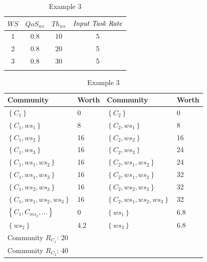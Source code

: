 \documentclass[10pt,journal,cspaper,compsoc]{IEEEtran}
\begin{document}
\begin{table}[!t]
\renewcommand{\arraystretch}{1.3}
\caption{Example 3} \label{example_3} \centering
\begin{tabular}{c c c c}
\hline
$WS$ & $QoS_{ws}$ & $Th_{ws}$ & $\text{\emph{Input Task Rate}}$\\
\hline
1 & 0.8 & 10 & 5\\
2 & 0.8 & 20 & 5\\
3 & 0.8 & 30 & 5\\
\hline\\
\end{tabular}
%
\renewcommand{\arraystretch}{1.3}
\label{example_3_2} \centering
\begin{tabular}{l l || l l}
\hline
Community & Worth & Community & Worth\\
\hline
$\left\{C_{1}\right\}$ & 0 & $\left\{C_{2}\right\}$ & 0\\
$\left\{C_{1}, ws_1\right\}$ & 8 & $\left\{C_{2}, ws_1\right\}$ & 8\\
$\left\{C_{1}, ws_2\right\}$ & 16 & $\left\{C_{2}, ws_2\right\}$ & 16\\
$\left\{C_{1}, ws_3\right\}$ & 16 & $\left\{C_{2}, ws_3\right\}$ & 24\\
$\left\{C_{1}, ws_1, ws_2\right\}$ & 16 & $\left\{C_{2}, ws_1, ws_2\right\}$ & 24\\
$\left\{C_{1}, ws_1, ws_3\right\}$ & 16 & $\left\{C_{2}, ws_1, ws_3\right\}$ & 32\\
$\left\{C_{1}, ws_2, ws_3\right\}$ & 16 & $\left\{C_{2}, ws_2, ws_3\right\}$ & 32\\
$\left\{C_{1}, ws_1, ws_2, ws_3\right\}$ & 16 & $\left\{C_{2}, ws_1, ws_2, ws_3\right\}$ & 32\\
$\left\{C_{1}, C_{ms_2}, ...\right\}$ & 0 & $\left\{ws_1\right\}$ & 6.8\\
$\left\{ws_2\right\}$ & 4.2 & $\left\{ws_3\right\}$ & 6.8\\
\hline
Community $R_{C_1}$: 20 \\ Community $R_{C_2}$: 40\\
\hline
\end{tabular}
\end{table}
\end{document}
